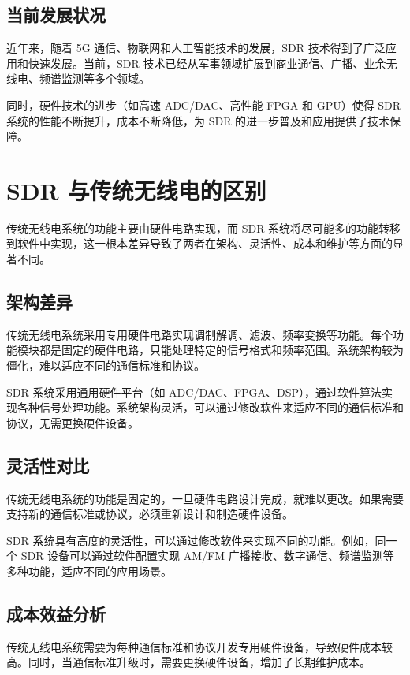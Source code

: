 \documentclass[UTF8]{ctexbook}
\begin{document}
\subsection{当前发展状况}

近年来，随着 5G 通信、物联网和人工智能技术的发展，SDR 技术得到了广泛应用和快速发展。当前，SDR 技术已经从军事领域扩展到商业通信、广播、业余无线电、频谱监测等多个领域。

同时，硬件技术的进步（如高速 ADC/DAC、高性能 FPGA 和 GPU）使得 SDR 系统的性能不断提升，成本不断降低，为 SDR 的进一步普及和应用提供了技术保障。
\section{SDR 与传统无线电的区别}

传统无线电系统的功能主要由硬件电路实现，而 SDR 系统将尽可能多的功能转移到软件中实现，这一根本差异导致了两者在架构、灵活性、成本和维护等方面的显著不同。

\subsection{架构差异}

传统无线电系统采用专用硬件电路实现调制解调、滤波、频率变换等功能。每个功能模块都是固定的硬件电路，只能处理特定的信号格式和频率范围。系统架构较为僵化，难以适应不同的通信标准和协议。

SDR 系统采用通用硬件平台（如 ADC/DAC、FPGA、DSP），通过软件算法实现各种信号处理功能。系统架构灵活，可以通过修改软件来适应不同的通信标准和协议，无需更换硬件设备。

\subsection{灵活性对比}

传统无线电系统的功能是固定的，一旦硬件电路设计完成，就难以更改。如果需要支持新的通信标准或协议，必须重新设计和制造硬件设备。

SDR 系统具有高度的灵活性，可以通过修改软件来实现不同的功能。例如，同一个 SDR 设备可以通过软件配置实现 AM/FM 广播接收、数字通信、频谱监测等多种功能，适应不同的应用场景。

\subsection{成本效益分析}

传统无线电系统需要为每种通信标准和协议开发专用硬件设备，导致硬件成本较高。同时，当通信标准升级时，需要更换硬件设备，增加了长期维护成本。
\end{document}
